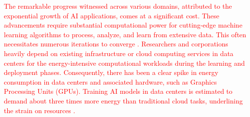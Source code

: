 \documentclass[12pt]{article}
\newcommand\myhl[1]{\textcolor{red}{#1}}
\begin{document}



\myhl{The remarkable progress witnessed across various domains, attributed to the exponential growth of AI applications, comes at a significant cost. These advancements require substantial computational power for cutting-edge machine learning algorithms to process, analyze, and learn from extensive data. This often necessitates numerous iterations to converge \cite{Strubell2019EnergyPolicyConsiderations}. Researchers and corporations heavily depend on existing infrastructure or cloud computing services in data centers for the energy-intensive computational workloads during the learning and deployment phases. Consequently, there has been a clear spike in energy consumption in data centers and associated hardware, such as Graphics Processing Units (GPUs). Training AI models in data centers is estimated to demand about three times more energy than traditional cloud tasks, underlining the strain on resources \cite{Thomas2023cloudusesmassive}.}
\end{document}
